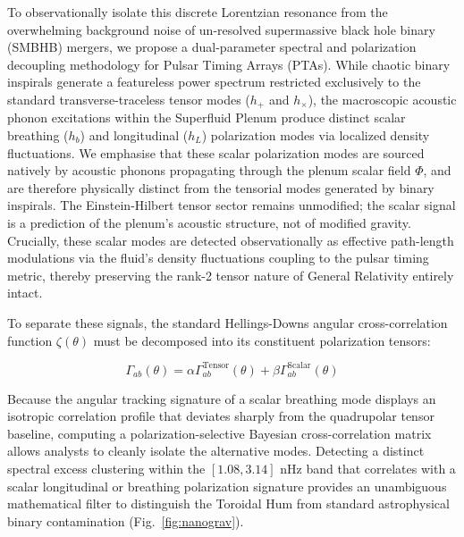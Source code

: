 \documentclass[aps,prd,10pt,twocolumn,superscriptaddress,nofootinbib,floatfix]{revtex4-2}
\begin{document}
To observationally isolate this discrete Lorentzian resonance from the overwhelming background noise of un-resolved supermassive black hole binary (SMBHB) mergers, we propose a dual-parameter spectral and polarization decoupling methodology for Pulsar Timing Arrays (PTAs). While chaotic binary inspirals generate a featureless power spectrum restricted exclusively to the standard transverse-traceless tensor modes ($h_+$ and $h_{\times}$), the macroscopic acoustic phonon excitations within the Superfluid Plenum produce distinct scalar breathing ($h_b$) and longitudinal ($h_L$) polarization modes via localized density fluctuations. We emphasise that these scalar polarization modes are sourced natively by acoustic phonons propagating through the plenum scalar field $\Phi$, and are therefore physically distinct from the tensorial modes generated by binary inspirals. The Einstein-Hilbert tensor sector remains unmodified; the scalar signal is a prediction of the plenum's acoustic structure, not of modified gravity. Crucially, these scalar modes are detected observationally as effective path-length modulations via the fluid's density fluctuations coupling to the pulsar timing metric, thereby preserving the rank-2 tensor nature of General Relativity entirely intact.

To separate these signals, the standard Hellings-Downs angular cross-correlation function $\zeta(\theta)$ must be decomposed into its constituent polarization tensors:

\begin{equation}
\Gamma_{ab}(\theta) = \alpha \Gamma_{ab}^{\text{Tensor}}(\theta) + \beta \Gamma_{ab}^{\text{Scalar}}(\theta)
\end{equation}

Because the angular tracking signature of a scalar breathing mode displays an isotropic correlation profile that deviates sharply from the quadrupolar tensor baseline, computing a polarization-selective Bayesian cross-correlation matrix allows analysts to cleanly isolate the alternative modes. Detecting a distinct spectral excess clustering within the $[1.08, 3.14]\text{ nHz}$ band that correlates with a scalar longitudinal or breathing polarization signature provides an unambiguous mathematical filter to distinguish the Toroidal Hum from standard astrophysical binary contamination (Fig.~\ref{fig:nanograv}).
\end{document}
